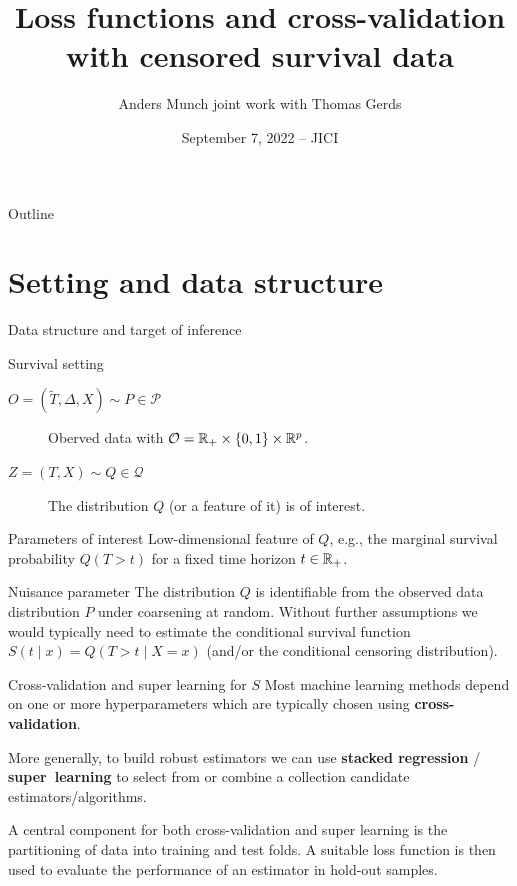 \documentclass[smaller]{beamer}\usepackage{listings}
\institute{PhD Student, Section of Biostatistics \\ University of Copenhagen}
\author{Anders Munch \newline \small joint work with Thomas Gerds}
\date{September 7, 2022 -- JICI}
\title{Loss functions and cross-validation with censored survival data}
\begin{document}
\maketitle
\begin{frame}{Outline}
\tableofcontents
\end{frame}

\section{Setting and data structure}
\label{sec:org2f6c6ea}
\begin{frame}[label={sec:orgeb4e8b4}]{Data structure and target of inference}
\small
\begin{block}{Survival setting}
\begin{description}
\item[{\(O = (\tilde T, \Delta, X) \sim P \in \mathcal{P}\)}] Oberved data with \(\mathcal{O} = \mathbb{R}_+
  \times \{0,1\} \times \mathbb{R}^p\).
\item[{\(Z = (T, X) \sim Q \in \mathcal{Q}\)}] The distribution \(Q\) (or a feature of it) is of interest.
\end{description}

\hfill
\end{block}

\begin{block}{Parameters of interest}
Low-dimensional feature of \(Q\), e.g., the marginal survival probability \(Q(T > t)\) for a fixed
time horizon \(t \in \mathbb{R}_+\).

\hfill
\end{block}


\begin{block}{Nuisance parameter}
The distribution \(Q\) is identifiable from the observed data distribution \(P\) under coarsening at
random. Without further assumptions we would typically need to estimate the conditional survival
function \(S(t \mid x) = Q(T > t \mid X=x)\) (and/or the conditional censoring distribution).
\end{block}
\end{frame}

\begin{frame}[label={sec:org75ad0a2}]{Cross-validation and super learning for \(S\)}
\pause Most machine learning methods depend on one or more hyperparameters which are typically
chosen using \textbf{cross-validation}.

\vfill

More generally, to build robust estimators we can use \textbf{stacked regression} /
\textbf{super~learning} \citep{breiman1996stacked,van2007super} to select from or combine a
collection candidate estimators/algorithms.

\vfill

A central component for both cross-validation and super learning is the partitioning of data into
training and test folds. A suitable loss function is then used to evaluate the performance of an
estimator in hold-out samples.
\end{frame}
\end{document}
